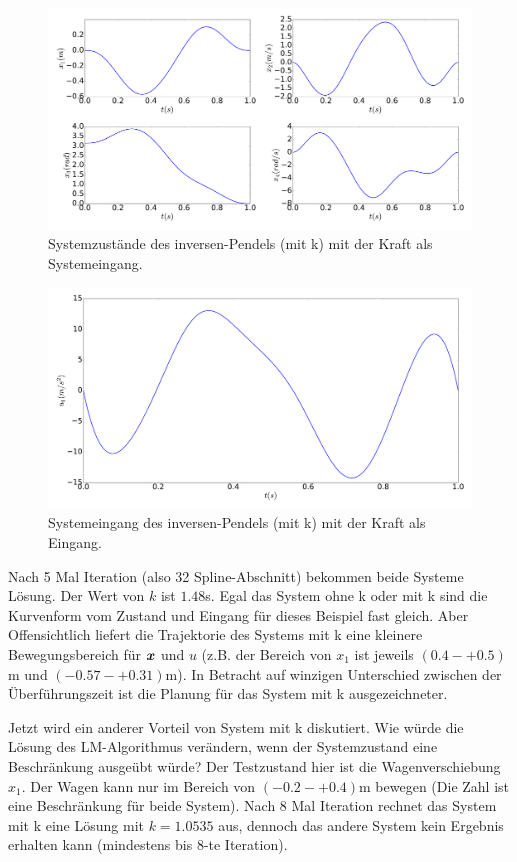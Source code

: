 \begin{beispiel}
	\begin{figure}
		\centering
		\includegraphics[width=15.5cm]{bild/30_32/example0_mit_k_x_ori.pdf}
		\caption{Systemzustände des inversen-Pendels (mit k) mit der Kraft als Systemeingang.}
		\label{fig:Inverses_Pendel_mit_k_x_ori}
	\end{figure}
	
	\begin{figure}
		\centering
		\includegraphics[width=12cm]{bild/30_32/example0_mit_k_u_ori.pdf}
		\caption{Systemeingang des inversen-Pendels (mit k) mit der Kraft als Eingang.}
		\label{fig:Inverses_Pendel_mit_k_u_ori}
	\end{figure}
	
	Nach 5 Mal Iteration (also 32 Spline-Abschnitt) bekommen beide Systeme Lösung. Der Wert von $k$ ist $1.48$s. Egal das System ohne k oder mit k sind die Kurvenform vom Zustand und Eingang für dieses Beispiel fast gleich. Aber Offensichtlich liefert die Trajektorie des Systems mit k eine kleinere Bewegungsbereich für $\boldsymbol x$ und $u$ (z.B. der Bereich von $x_{1}$ ist jeweils $(0.4-+0.5)$m und $(-0.57-+0.31)$m). In Betracht auf winzigen Unterschied zwischen der Überführungszeit ist die Planung für das System mit k ausgezeichneter.
	
	Jetzt wird ein anderer Vorteil von System mit k diskutiert. Wie würde die Lösung des LM-Algorithmus verändern, wenn der Systemzustand eine Beschränkung ausgeübt würde? Der Testzustand hier ist die Wagenverschiebung $x_{1}$. Der Wagen kann nur im Bereich von $(-0.2-+0.4)$m bewegen (Die Zahl ist eine Beschränkung für beide System). Nach 8 Mal Iteration rechnet das System mit k eine Lösung mit $k=1.0535$ aus, dennoch das andere System kein Ergebnis erhalten kann (mindestens bis 8-te Iteration).
	

\end{beispiel}

